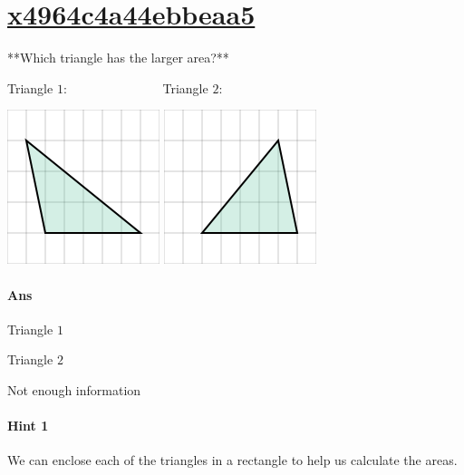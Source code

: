 \documentclass[twocolumn,10pt]{article}
\def\shrinkfactor{0.55}
\begin{document}
\section{\href{https://www.khanacademy.org/devadmin/content/items/x4964c4a44ebbeaa5}{x4964c4a44ebbeaa5}}

\noindent
**Which triangle has the larger area?**  

Triangle $1$:  $\qquad\qquad \qquad ~~~~$ Triangle $2$:  

\includegraphics[scale=\shrinkfactor]{figures/dd6e582868d2bc3d35ca3f329428a4681201dfe1.png} 
\includegraphics[scale=\shrinkfactor]{figures/a0b7bee11f79cc45ba1a5a0414484104a83a92ec.png}

\paragraph{Ans} 

Triangle $1$

Triangle $2$


 Not enough information



\paragraph{Hint 1}We can enclose each of the triangles in a rectangle to help us calculate the areas.  
\end{document}
